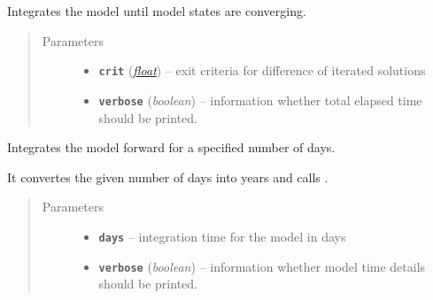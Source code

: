 \documentclass[letterpaper,10pt,english]{sphinxmanual}
\begin{document}
\begin{fulllineitems}
\begin{fulllineitems}
\label{api/climlab.process:climlab.process.time_dependent_process.TimeDependentProcess.integrate_converge}
Integrates the model until model states are converging.
\begin{quote}\begin{description}
\item[{Parameters}] \leavevmode\begin{itemize}
\item {} 
\textbf{\texttt{crit}} (\href{http://docs.python.org/2.7/library/functions.html\#float}{\emph{float}}) -- exit criteria for difference of iterated solutions

\item {} 
\textbf{\texttt{verbose}} (\emph{boolean}) -- information whether total elapsed time should be 
printed.

\end{itemize}

\end{description}\end{quote}

\end{fulllineitems}


\begin{fulllineitems}
\label{api/climlab.process:climlab.process.time_dependent_process.TimeDependentProcess.integrate_days}
Integrates the model forward for a specified number of days.

It convertes the given number of days into years and calls 
{\hyperref[api/climlab.process:climlab.process.time_dependent_process.TimeDependentProcess.integrate_years]{\emph{}}}.
\begin{quote}\begin{description}
\item[{Parameters}] \leavevmode\begin{itemize}
\item {} 
\textbf{\texttt{days}} -- integration time for the model in days

\item {} 
\textbf{\texttt{verbose}} (\emph{boolean}) -- information whether model time details should be 
printed.


\end{itemize}
\end{description}
\end{quote}
\end{fulllineitems}
\end{fulllineitems}
\end{document}
